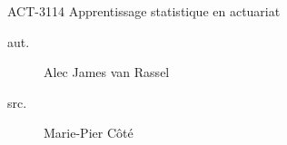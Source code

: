 \begin{contrib}{ACT-3114\: Apprentissage statistique en actuariat}
\begin{description}
	\item[aut.] Alec James van Rassel
	\item[src.] Marie-Pier Côté
\end{description}
\end{contrib}